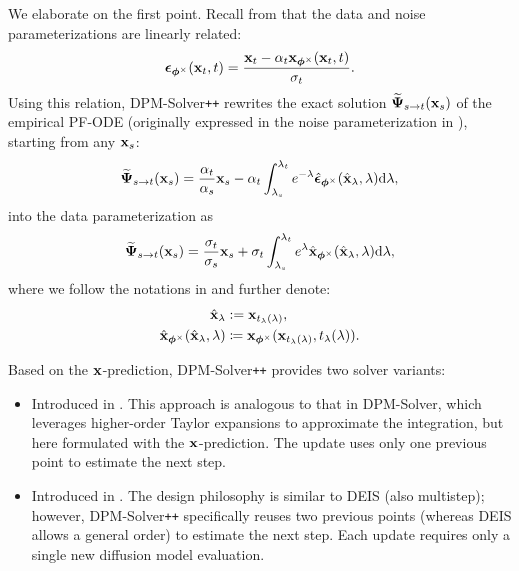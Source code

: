 We elaborate on the first point. Recall from  that the data and noise parameterizations are linearly related:  
\[
\bm{\epsilon}_{\bm{\phi}^\times}({\mathbf{x}}_t, t) = \frac{{\mathbf{x}}_t - \alpha_t {\mathbf{x}}_{\bm{\phi}^\times}({\mathbf{x}}_t, t)}{\sigma_t}.
\]  
Using this relation, DPM-Solver\texttt{++} rewrites the exact solution $\widetilde{{\bm{\Psi}}}_{s\to t}({\mathbf{x}}_s)$ of the empirical PF-ODE (originally expressed in the noise parameterization in ), starting from any ${\mathbf{x}}_s$:
\[
    \widetilde{{\bm{\Psi}}}_{s\to t}({\mathbf{x}}_s)
    = \frac{\alpha_t}{\alpha_s}{\mathbf{x}}_s
      - \alpha_t \int_{\lambda_s}^{\lambda_t}
        e^{-\lambda}  \hat{\bm{\epsilon}}_{\bm{\phi}^\times}(\hat{{\mathbf{x}}}_\lambda, \lambda)  \mathrm{d}\lambda,
\]
into the data parameterization as
\[
    \widetilde{{\bm{\Psi}}}_{s\to t}({\mathbf{x}}_s)
    = \frac{\sigma_t}{\sigma_s}{\mathbf{x}}_s
      + \sigma_t \int_{\lambda_s}^{\lambda_t}
        e^{\lambda}  \hat{{\mathbf{x}}}_{\bm{\phi}^\times}(\hat{{\mathbf{x}}}_\lambda, \lambda)  \mathrm{d}\lambda,
\]
where we follow the notations in  and further denote:
\begin{align*}
\begin{aligned}
 \hat{{\mathbf{x}}}_{\lambda} & := {\mathbf{x}}_{t_\lambda(\lambda)}, \\
 \hat{{\mathbf{x}}}_{\bm{\phi}^\times}(\hat{{\mathbf{x}}}_{\lambda}, \lambda) & \coloneqq {\mathbf{x}}_{\bm{\phi}^\times}({\mathbf{x}}_{t_\lambda(\lambda)}, t_\lambda(\lambda)).
\end{aligned}
\end{align*}

Based on the ${\mathbf{x}}$-prediction, DPM-Solver\texttt{++} provides two solver variants:
\begin{itemize}
    \item {} Introduced in . This approach is analogous to that in DPM-Solver, which leverages higher-order Taylor expansions to approximate the integration, but here formulated with the ${\mathbf{x}}$-prediction. The update uses only one previous point to estimate the next step.  
    \item {} Introduced in . The design philosophy is similar to DEIS (also multistep); however, DPM-Solver\texttt{++} specifically reuses two previous points (whereas DEIS allows a general order) to estimate the next step. Each update requires only a single new diffusion model evaluation. 
\end{itemize}



